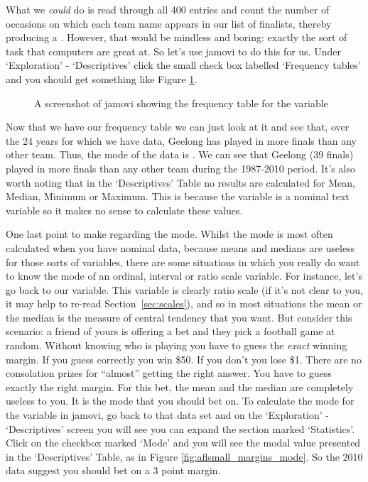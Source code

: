 What we {\it could} do is read through all 400 entries and count the number of occasions on which each team name appears in our list of finalists, thereby producing a . However, that would be mindless and boring: exactly the sort of task that computers are great at. So let's use jamovi to do this for us. Under `Exploration' - `Descriptives' click the small check box labelled `Frequency tables' and you should get something like Figure \ref{fig:aflsmall_finalists_mode}. 

\begin{figure}[!!htp]
\begin{center}
\caption{A screenshot of jamovi showing the frequency table for the  variable }
\label{fig:aflsmall_finalists_mode}
\HR
\end{center}
\end{figure}

Now that we have our frequency table we can just look at it and see that, over the 24 years for which we have data, Geelong has played in more finals than any other team. Thus, the mode of the  data is . We can see that Geelong (39 finals) played in more finals than any other team during the 1987-2010 period. It's also worth noting that in the `Descriptives' Table no results are calculated for Mean, Median, Minimum or Maximum. This is because the  variable is a nominal text variable so it makes no sense to calculate these values.

One last point to make regarding the mode. Whilst the mode is most often calculated when you have nominal data, because means and medians are useless for those sorts of variables, there are some situations in which you really do want to know the mode of an ordinal, interval or ratio scale variable. For instance, let's go back to our  variable. This variable is clearly ratio scale (if it's not clear to you, it may help to re-read Section~\ref{sec:scales}), and so in most situations the mean or the median is the measure of central tendency that you want. But consider this scenario: a friend of yours is offering a bet and they pick a football game at random. Without knowing who is playing you have to guess the {\it exact} winning margin. If you guess correctly you win \$50. If you don't you lose \$1. There are no consolation prizes for ``almost'' getting the right answer. You have to guess exactly the right margin. For this bet, the mean and the median are completely useless to you. It is the mode that you should bet on. To calculate the mode for the  variable in jamovi, go back to that data set and on the `Exploration' - `Descriptives' screen you will see you can expand the section marked `Statistics'. Click on the checkbox marked `Mode' and you will see the modal value presented in the `Descriptives' Table, as in Figure \ref{fig:aflsmall_margins_mode}. So the 2010 data suggest you should bet on a 3 point margin.

